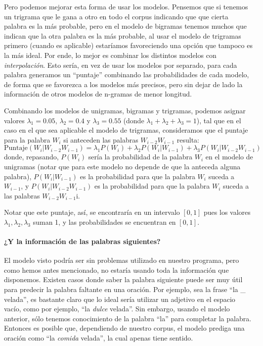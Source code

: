 \documentclass[a4paper]{article}
\begin{document}
Pero podemos mejorar esta forma de usar los modelos. Pensemos que si tenemos un trigrama que le gana a otro en todo el corpus indicando que que cierta palabra es la más probable, pero en el modelo de bigramas tenemos muchos que indican que la otra palabra es la más probable, al usar el modelo de trigramas primero (cuando es aplicable) estaríamos favoreciendo una opción que tampoco es la más ideal. Por ende, lo mejor es combinar los distintos modelos con \textit{interpolación}. Esto sería, en vez de usar los modelos por separado, para cada palabra generamos un ``puntaje'' combinando las probabilidades de cada modelo, de forma que se favorezca a los modelos más precisos, pero sin dejar de lado la información de otros modelos de n-gramas de menor longitud.

Combinando los modelos de unigramas, bigramas y trigramas, podemos asignar valores $\lambda_1 = 0.05$, $\lambda_2 = 0.4$ y $\lambda_3 = 0.55$ (donde $\lambda_1 + \lambda_2 + \lambda_3 = 1$), tal que en el caso en el que sea aplicable el modelo de trigramas, consideramos que el puntaje para la palabra $W_i$ si anteceden las palabras $W_{i-2}W_{i-1}$ resulta:
\[
    \text{Puntaje}(W_i|W_{i-2}W_{i-1}) = \lambda_1 P(W_i) + \lambda_2 P(W_i|W_{i-1}) + \lambda_3 P(W_i|W_{i-2}W_{i-1})
\]
donde, repasando, $P(W_i)$ sería la probabilidad de la palabra $W_i$ en el modelo de unigramas (notar que para este modelo no depende de que la anteceda alguna palabra), $P(W_i|W_{i-1})$ es la probabilidad para que la palabra $W_i$ suceda a $W_{i-1}$, y $P(W_i|W_{i-2}W_{i-1})$ es la probabilidad para que la palabra $W_i$ suceda a las palabras $W_{i-2}W_{i-1}$i\cite{TdsGen}.

Notar que este puntaje, así, se encontraría en un intervalo $[0,1]$ pues los valores $\lambda_1, \lambda_2,\lambda_3$ suman 1, y las probabilidades se encuentran en $[0,1]$.

\paragraph{¿Y la información de las palabras siguientes?}

El modelo visto podría ser sin problemas utilizado en nuestro programa, pero como hemos antes mencionado, no estaría usando toda la información que disponemos. Existen casos donde saber la palabra siguiente puede ser muy útil para predecir la palabra faltante en una oración. Por ejemplo, sea la frase ``la \_ velada'', es bastante claro que lo ideal sería utilizar un adjetivo en el espacio vacío, como por ejemplo, ``la \textit{dulce} velada''. Sin embargo, usando el modelo anterior, sólo tenemos conocimiento de la palabra ``la'' para completar la palabra. Entonces es posible que, dependiendo de nuestro corpus, el modelo prediga una oración como ``la \textit{comida} velada'', la cual apenas tiene sentido.
\end{document}

